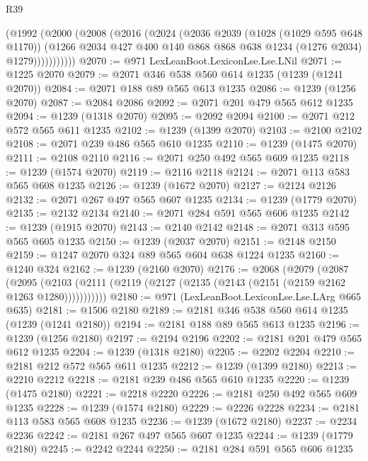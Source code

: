 \begin{lexlean}{R39}
\begin{coremodule}
            (@1992
              (@2000
                (@2008
                  (@2016
                    (@2024
                      (@2036
                        @2039
                        (@1028 (@1029 @595 @648 @1170))
                        (@1266
                          @2034
                          @427
                          @400
                          @140
                          @868
                          @868
                          @638
                          @1234
                          (@1276 @2034)
                          @1279)))))))))))
@2070 := @971 LexLeanBoot.LexiconLse.Lse.LNil
@2071 := @1225 @2070
@2079 := @2071 @346 @538 @560 @614 @1235 (@1239 (@1241 @2070))
@2084 := @2071 @188 @89 @565 @613 @1235
@2086 := @1239 (@1256 @2070)
@2087 := @2084 @2086
@2092 := @2071 @201 @479 @565 @612 @1235
@2094 := @1239 (@1318 @2070)
@2095 := @2092 @2094
@2100 := @2071 @212 @572 @565 @611 @1235
@2102 := @1239 (@1399 @2070)
@2103 := @2100 @2102
@2108 := @2071 @239 @486 @565 @610 @1235
@2110 := @1239 (@1475 @2070)
@2111 := @2108 @2110
@2116 := @2071 @250 @492 @565 @609 @1235
@2118 := @1239 (@1574 @2070)
@2119 := @2116 @2118
@2124 := @2071 @113 @583 @565 @608 @1235
@2126 := @1239 (@1672 @2070)
@2127 := @2124 @2126
@2132 := @2071 @267 @497 @565 @607 @1235
@2134 := @1239 (@1779 @2070)
@2135 := @2132 @2134
@2140 := @2071 @284 @591 @565 @606 @1235
@2142 := @1239 (@1915 @2070)
@2143 := @2140 @2142
@2148 := @2071 @313 @595 @565 @605 @1235
@2150 := @1239 (@2037 @2070)
@2151 := @2148 @2150
@2159 := @1247 @2070 @324 @89 @565 @604 @638 @1224 @1235
@2160 := @1240 @324
@2162 := @1239 (@2160 @2070)
@2176 := @2068
    (@2079
      (@2087
        (@2095 (@2103 (@2111 (@2119 (@2127 (@2135 (@2143 (@2151 (@2159 @2162 @1263 @1280)))))))))))
@2180 := @971 (LexLeanBoot.LexiconLse.Lse.LArg @665 @635)
@2181 := @1506 @2180
@2189 := @2181 @346 @538 @560 @614 @1235 (@1239 (@1241 @2180))
@2194 := @2181 @188 @89 @565 @613 @1235
@2196 := @1239 (@1256 @2180)
@2197 := @2194 @2196
@2202 := @2181 @201 @479 @565 @612 @1235
@2204 := @1239 (@1318 @2180)
@2205 := @2202 @2204
@2210 := @2181 @212 @572 @565 @611 @1235
@2212 := @1239 (@1399 @2180)
@2213 := @2210 @2212
@2218 := @2181 @239 @486 @565 @610 @1235
@2220 := @1239 (@1475 @2180)
@2221 := @2218 @2220
@2226 := @2181 @250 @492 @565 @609 @1235
@2228 := @1239 (@1574 @2180)
@2229 := @2226 @2228
@2234 := @2181 @113 @583 @565 @608 @1235
@2236 := @1239 (@1672 @2180)
@2237 := @2234 @2236
@2242 := @2181 @267 @497 @565 @607 @1235
@2244 := @1239 (@1779 @2180)
@2245 := @2242 @2244
@2250 := @2181 @284 @591 @565 @606 @1235

\end{coremodule}
\end{lexlean}
